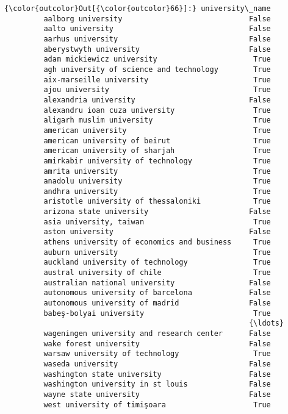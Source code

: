 \documentclass[11pt]{article}
\begin{document}
\begin{Verbatim}[commandchars=\\\{\}]
{\color{outcolor}Out[{\color{outcolor}66}]:} university\_name
         aalborg university                             False
         aalto university                               False
         aarhus university                              False
         aberystwyth university                         False
         adam mickiewicz university                      True
         agh university of science and technology        True
         aix-marseille university                        True
         ajou university                                 True
         alexandria university                          False
         alexandru ioan cuza university                  True
         aligarh muslim university                       True
         american university                             True
         american university of beirut                   True
         american university of sharjah                  True
         amirkabir university of technology              True
         amrita university                               True
         anadolu university                              True
         andhra university                               True
         aristotle university of thessaloniki            True
         arizona state university                       False
         asia university, taiwan                         True
         aston university                               False
         athens university of economics and business     True
         auburn university                               True
         auckland university of technology               True
         austral university of chile                     True
         australian national university                 False
         autonomous university of barcelona             False
         autonomous university of madrid                False
         babeş-bolyai university                         True
                                                        {\ldots}  
         wageningen university and research center      False
         wake forest university                         False
         warsaw university of technology                 True
         waseda university                              False
         washington state university                    False
         washington university in st louis              False
         wayne state university                         False
         west university of timişoara                    True

\end{Verbatim}
\end{document}
